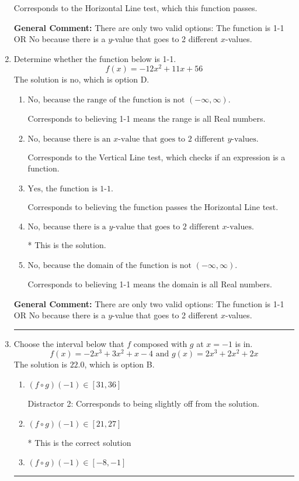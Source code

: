 \documentclass{extbook}[14pt]
\newcommand{\litem}[1]{\item #1

\rule{\textwidth}{0.4pt}}
\begin{document}
\begin{enumerate}
{\begin{enumerate}[label=\Alph*.]
Corresponds to the Horizontal Line test, which this function passes.
\end{enumerate}

\textbf{General Comment:} There are only two valid options: The function is 1-1 OR No because there is a $y$-value that goes to 2 different $x$-values.
}
\litem{
Determine whether the function below is 1-1.
\[ f(x) = -12 x^2 + 11 x + 56 \]The solution is \( \text{no} \), which is option D.\begin{enumerate}[label=\Alph*.]
\item \( \text{No, because the range of the function is not $(-\infty, \infty)$.} \)

Corresponds to believing 1-1 means the range is all Real numbers.
\item \( \text{No, because there is an $x$-value that goes to 2 different $y$-values.} \)

Corresponds to the Vertical Line test, which checks if an expression is a function.
\item \( \text{Yes, the function is 1-1.} \)

Corresponds to believing the function passes the Horizontal Line test.
\item \( \text{No, because there is a $y$-value that goes to 2 different $x$-values.} \)

* This is the solution.
\item \( \text{No, because the domain of the function is not $(-\infty, \infty)$.} \)

Corresponds to believing 1-1 means the domain is all Real numbers.
\end{enumerate}

\textbf{General Comment:} There are only two valid options: The function is 1-1 OR No because there is a $y$-value that goes to 2 different $x$-values.
}
\litem{
Choose the interval below that $f$ composed with $g$ at $x=-1$ is in.
\[ f(x) = -2x^{3} +3 x^{2} +x -4 \text{ and } g(x) = 2x^{3} +2 x^{2} +2 x \]The solution is \( 22.0 \), which is option B.\begin{enumerate}[label=\Alph*.]
\item \( (f \circ g)(-1) \in [31, 36] \)

 Distractor 2: Corresponds to being slightly off from the solution.
\item \( (f \circ g)(-1) \in [21, 27] \)

* This is the correct solution
\item \( (f \circ g)(-1) \in [-8, -1] \)


\end{enumerate}}
\end{enumerate}
\end{document}
